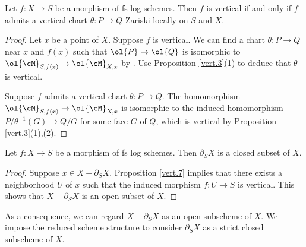 \documentclass[10pt]{amsart}
\begin{document}
\begin{prop}
\label{vert.7}
Let $f\colon X\to S$ be a morphism of fs log schemes.
Then $f$ is vertical if and only if $f$ admits a vertical chart $\theta\colon P\to Q$ Zariski locally on $S$ and $X$.
\end{prop}
\begin{proof}
Let $x$ be a point of $X$.
Suppose $f$ is vertical.
We can find a chart $\theta\colon P\to Q$ near $x$ and $f(x)$ such that $\ol{P}\to \ol{Q}$ is isomorphic to $\ol{\cM}_{S,f(x)}\to \ol{\cM}_{X,x}$ by \cite[Remark II.2.3.2]{Ogu}.
Use Proposition \ref{vert.3}(1) to deduce that $\theta$ is vertical.

Suppose $f$ admits a vertical chart $\theta\colon P\to Q$.
The homomorphism
$\ol{\cM}_{S,f(x)}\to \ol{\cM}_{X,x}$ is isomorphic to the induced homomorphism $P/\theta^{-1}(G)\to Q/G$ for some face $G$ of $Q$, which is vertical by Proposition \ref{vert.3}(1),(2).
\end{proof}



\begin{prop}
\label{vert.2}
Let $f\colon X\to S$ be a morphism of fs log schemes.
Then $\partial_S X$ is a closed subset of $X$.
\end{prop}
\begin{proof}
Suppose $x\in X-\partial_S X$.
Proposition \ref{vert.7} implies that there exists a neighborhood $U$ of $x$ such that the induced morphism $f\colon U\to S$ is vertical.
This shows that $X-\partial_S X$ is an open subset of $X$.
\end{proof}

As a consequence, we can regard $X-\partial_S X$ as an open subscheme of $X$.
We impose the reduced scheme structure to consider $\partial_S X$ as a strict closed subscheme of $X$.
\end{document}
